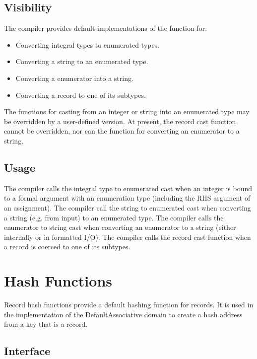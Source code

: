 \subsection{Visibility}

The compiler provides default implementations of the  function for:
\begin{itemize}
\item Converting integral types to enumerated types.
\item Converting a string to an enumerated type.
\item Converting a enumerator into a string.
\item Converting a record to one of its subtypes.
\end{itemize}

The functions for casting from an integer or string into an enumerated type may be
overridden by a user-defined version.  At present, the record cast function cannot be
overridden, nor can the function for converting an enumerator to a string.

\subsection{Usage}

The compiler calls the integral type to enumerated cast when an integer is bound to a
formal argument with an enumeration type (including the RHS argument of an assignment).
The compiler call the string to enumerated cast when converting a string (e.g. from input)
to an enumerated type.  
The compiler calls the enumerator to string cast when converting
an enumerator to a string (either internally or in formatted I/O).  
The compiler calls the record cast function when a record is coerced to one of its
subtypes.



\section{Hash Functions}

Record hash functions provide a default hashing function for records.  It is used in the
implementation of the DefaultAssociative domain to create a hash address from a key that
is a record.

\subsection{Interface}

